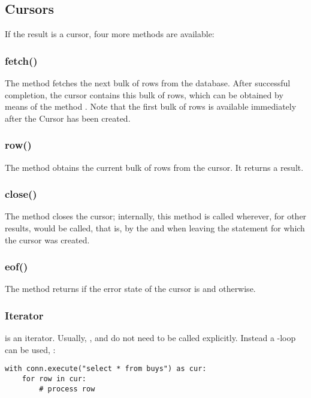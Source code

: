 \clearpage
\subsection{Cursors}
If the result is a cursor,
four more methods are available:

\subsubsection{fetch()}
The method fetches the next bulk
of rows from the database.
After successful completion,
the cursor contains this bulk
of rows, which can be obtained by means of
the method .
Note that the first bulk of rows
is available immediately after
the Cursor has been created.

\subsubsection{row()}
The method obtains the current
bulk of rows from the cursor.
It returns a  result.

\subsubsection{close()}
The method closes the cursor;
internally, this method is called
wherever, for other results, 
would be called, that is, by the 
and when leaving the  statement
for which the cursor was created.

\subsubsection{eof()}
The method returns 
if the error state of the cursor
is  and 
otherwise.

\subsubsection{Iterator}
 is an iterator.
Usually, , 
and  do not need to be called
explicitly.
Instead a -loop  can be used, \eg:

\begin{python}
\begin{lstlisting}
with conn.execute("select * from buys") as cur:
    for row in cur:
        # process row 
\end{lstlisting}
\end{python}

